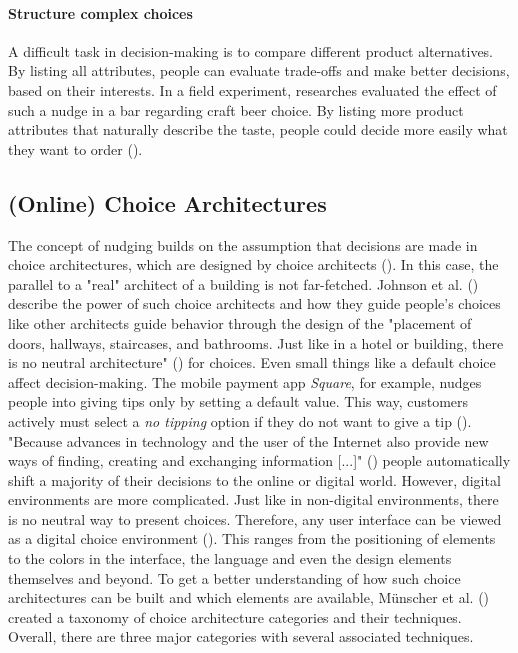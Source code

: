 \paragraph{Structure complex choices}
A difficult task in decision-making is to compare different product alternatives. By listing all attributes, people can evaluate trade-offs and make better decisions, based on their interests. In a field experiment, researches evaluated the effect of such a nudge in a bar regarding craft beer choice. By listing more product attributes that naturally describe the taste, people could decide more easily what they want to order (\cite{malone_excessive_2017}).


\subsection{(Online) Choice Architectures}
The concept of nudging builds on the assumption that decisions are made in choice architectures, which are designed by choice architects (\cite{thaler_nudge:_2009}). In this case, the parallel to a "real" architect of a building is not far-fetched. Johnson et al. (\cite{johnson_beyond_2012}) describe the power of such choice architects and how they guide people's choices like other architects guide behavior through the design of the "placement of doors, hallways, staircases, and bathrooms. Just like in a hotel or building, there is no neutral architecture" (\cite[p.488]{johnson_beyond_2012}) for choices. Even small things like a default choice affect decision-making. The mobile payment app \textit{Square}, for example, nudges people into giving tips only by setting a default value. This way, customers actively must select a \textit{no tipping} option if they do not want to give a tip (\cite{weinmann_digital_2016}). "Because advances in technology and the user of the Internet also provide new ways of finding, creating and exchanging information [...]" (\cite[p.609]{broniarczyk_decision_2014}) people automatically shift a majority of their decisions to the online or digital world. However, digital environments are more complicated. Just like in non-digital environments, there is no neutral way to present choices. Therefore, any user interface can be viewed as a digital choice environment (\cite{schneider_digital_2018}). This ranges from the positioning of elements to the colors in the interface, the language and even the design elements themselves and beyond.
To get a better understanding of how such choice architectures can be built and which elements are available, Münscher et al. (\citeyear{munscher_review_2016}) created a taxonomy of choice architecture categories and their techniques. Overall, there are three major categories with several associated techniques. 
